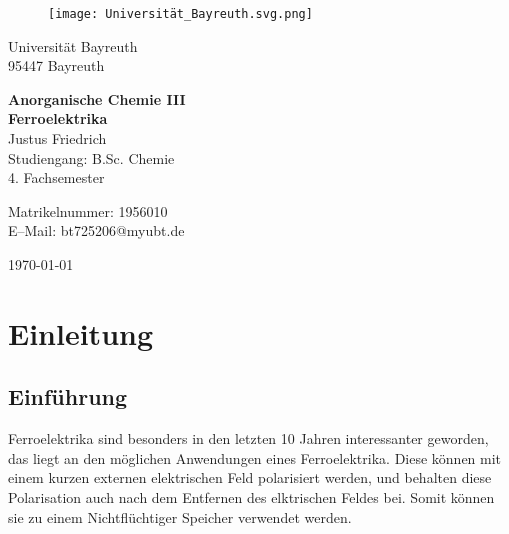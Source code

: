 \documentclass[12pt, a4paper]{article}
\begin{document}
\begin{figure}
    \texttt{[image: Universität\_Bayreuth.svg.png]}
\end{figure}



{\raggedright Universität Bayreuth\\  95447 Bayreuth}


\vspace{5cm}

\begin{center}
{\LARGE\bf{Anorganische Chemie III}} \\  
\vspace{1cm}
{\Large\bf{Ferroelektrika}}\\
\vspace{0.5cm}
{\large Justus Friedrich\\}
{Studiengang: B.Sc. Chemie\\}
{4. Fachsemester}
\end{center}





\thispagestyle{empty}
\begin{center}
{\small Matrikelnummer: 1956010 \\
E–Mail:  bt725206@myubt.de}
\end{center}

\vspace{5cm}

\begin{center}
  \today
\end{center}


\newpage
\tableofcontents
\thispagestyle{empty}


\newpage
\setcounter{page}{1}
\section{Einleitung}



\subsection{Einführung}
Ferroelektrika sind besonders in den letzten 10 Jahren interessanter geworden, 
das liegt an den möglichen Anwendungen eines Ferroelektrika. Diese können mit einem kurzen 
externen elektrischen Feld polarisiert werden, und behalten diese Polarisation auch nach dem Entfernen 
des elktrischen Feldes bei. Somit können sie zu einem Nichtflüchtiger Speicher verwendet werden.\cite{Damjanovic.1998}
\end{document}
